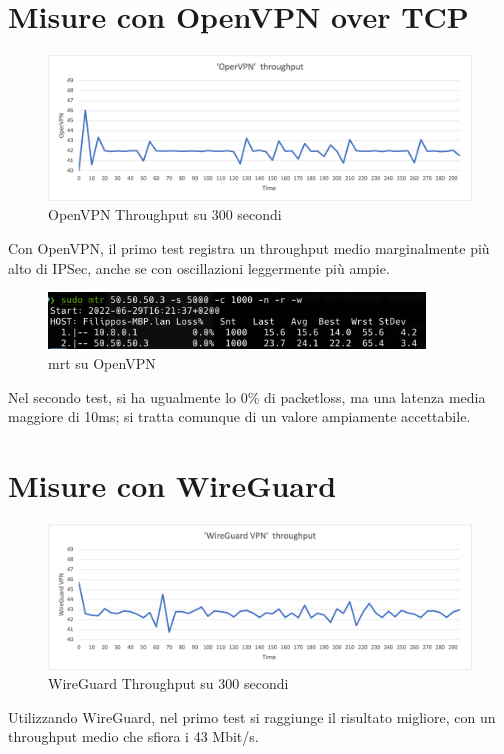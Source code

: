 \section{Misure con OpenVPN over TCP}
\begin{figure}[ht]
    \centering
    \includegraphics[width=12cm]{figure/vpn_thr.png-3.png}
    \caption{OpenVPN Throughput su 300 secondi}
\end{figure}
Con OpenVPN, il primo test registra un throughput medio marginalmente più alto di IPSec, anche se con oscillazioni leggermente più ampie.

\begin{figure}[ht]
    \centering
    \includegraphics[width=10cm]{figure/mtr_16min_ovpn.png}
    \caption{mrt su OpenVPN}
\end{figure}
Nel secondo test, si ha ugualmente lo 0\% di packetloss, ma una latenza media maggiore di 10ms; si tratta comunque di un valore ampiamente accettabile.


\section{Misure con WireGuard}
\begin{figure}[ht]
    \centering
    \includegraphics[width=12cm]{figure/vpn_thr.png-4.png}
    \caption{WireGuard Throughput su 300 secondi}
\end{figure}
Utilizzando WireGuard, nel primo test si raggiunge il risultato migliore, con un throughput medio che sfiora i 43 Mbit/s.

